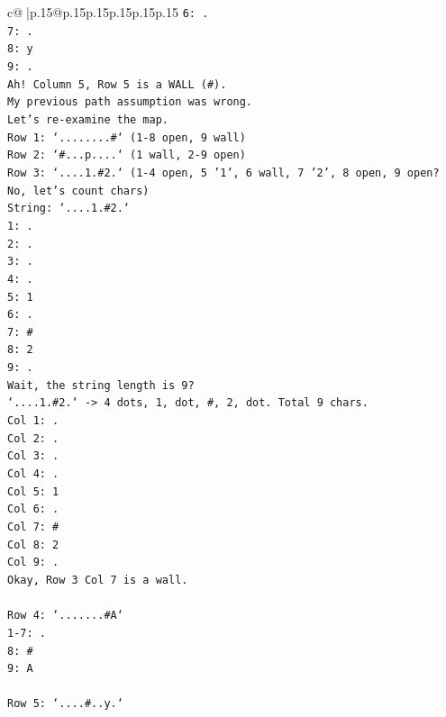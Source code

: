 \documentclass{article}
\begin{document}
{\begin{supertabular}{c@{$\;$}|p{.15\linewidth}@{}p{.15\linewidth}p{.15\linewidth}p{.15\linewidth}p{.15\linewidth}p{.15\linewidth}}
{{{\texttt{6: .} \\
\texttt{7: .} \\
\texttt{8: y} \\
\texttt{9: .} \\
\texttt{Ah! Column 5, Row 5 is a WALL (\#).} \\
\texttt{My previous path assumption was wrong.} \\
\texttt{Let's re{-}examine the map.} \\
\texttt{Row 1: `........\#` (1{-}8 open, 9 wall)} \\
\texttt{Row 2: `\#...p....` (1 wall, 2{-}9 open)} \\
\texttt{Row 3: `....1.\#2.` (1{-}4 open, 5 '1', 6 wall, 7 '2', 8 open, 9 open? No, let's count chars)} \\
\texttt{String: `....1.\#2.`} \\
\texttt{1: .} \\
\texttt{2: .} \\
\texttt{3: .} \\
\texttt{4: .} \\
\texttt{5: 1} \\
\texttt{6: .} \\
\texttt{7: \#} \\
\texttt{8: 2} \\
\texttt{9: .} \\
\texttt{Wait, the string length is 9?} \\
\texttt{`....1.\#2.` {-}> 4 dots, 1, dot, \#, 2, dot. Total 9 chars.} \\
\texttt{Col 1: .} \\
\texttt{Col 2: .} \\
\texttt{Col 3: .} \\
\texttt{Col 4: .} \\
\texttt{Col 5: 1} \\
\texttt{Col 6: .} \\
\texttt{Col 7: \#} \\
\texttt{Col 8: 2} \\
\texttt{Col 9: .} \\
\texttt{Okay, Row 3 Col 7 is a wall.} \\
\\ 
\texttt{Row 4: `.......\#A`} \\
\texttt{1{-}7: .} \\
\texttt{8: \#} \\
\texttt{9: A} \\
\\ 
\texttt{Row 5: `....\#..y.`} \\
}}}
\end{supertabular}}
\end{document}
